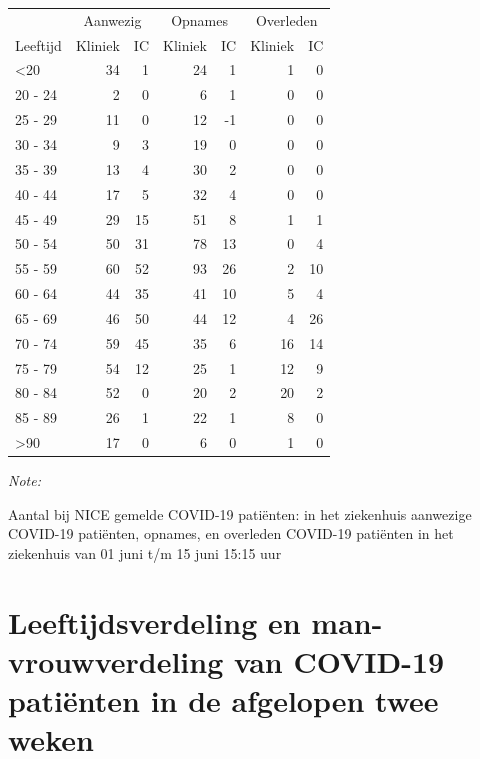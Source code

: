 \documentclass[
  english,
  man,floatsintext]{apa6}
\begin{document}
\begin{table}
\centering\begingroup\fontsize{10}{12}\selectfont

\begin{threeparttable}
\begin{tabular}{lrrrrrr}
\toprule
\multicolumn{1}{c}{ } & \multicolumn{2}{c}{Aanwezig} & \multicolumn{2}{c}{Opnames} & \multicolumn{2}{c}{Overleden} \\
\cmidrule(l{3pt}r{3pt}){2-3} \cmidrule(l{3pt}r{3pt}){4-5} \cmidrule(l{3pt}r{3pt}){6-7}
Leeftijd & Kliniek & IC & Kliniek & IC & Kliniek & IC\\
\midrule
<20 & 34 & 1 & 24 & 1 & 1 & 0\\
20 - 24 & 2 & 0 & 6 & 1 & 0 & 0\\
25 - 29 & 11 & 0 & 12 & -1 & 0 & 0\\
30 - 34 & 9 & 3 & 19 & 0 & 0 & 0\\
35 - 39 & 13 & 4 & 30 & 2 & 0 & 0\\
40 - 44 & 17 & 5 & 32 & 4 & 0 & 0\\
45 - 49 & 29 & 15 & 51 & 8 & 1 & 1\\
50 - 54 & 50 & 31 & 78 & 13 & 0 & 4\\
55 - 59 & 60 & 52 & 93 & 26 & 2 & 10\\
60 - 64 & 44 & 35 & 41 & 10 & 5 & 4\\
65 - 69 & 46 & 50 & 44 & 12 & 4 & 26\\
70 - 74 & 59 & 45 & 35 & 6 & 16 & 14\\
75 - 79 & 54 & 12 & 25 & 1 & 12 & 9\\
80 - 84 & 52 & 0 & 20 & 2 & 20 & 2\\
85 - 89 & 26 & 1 & 22 & 1 & 8 & 0\\
>90 & 17 & 0 & 6 & 0 & 1 & 0\\
\bottomrule
\end{tabular}
\begin{tablenotes}
\item \textit{Note: } 
\item Aantal bij NICE gemelde COVID-19 patiënten: in het ziekenhuis aanwezige COVID-19 patiënten, opnames, en overleden COVID-19 patiënten in het ziekenhuis van 01 juni t/m 15 juni 15:15 uur
\end{tablenotes}
\end{threeparttable}
\endgroup{}
\end{table}

\newpage

\hypertarget{leeftijdsverdeling-en-man-vrouwverdeling-van-covid-19-patiuxebnten-in-de-afgelopen-twee-weken}{%
\section{Leeftijdsverdeling en man-vrouwverdeling van COVID-19 patiënten in de afgelopen twee weken}\label{leeftijdsverdeling-en-man-vrouwverdeling-van-covid-19-patiuxebnten-in-de-afgelopen-twee-weken}}
\end{document}
